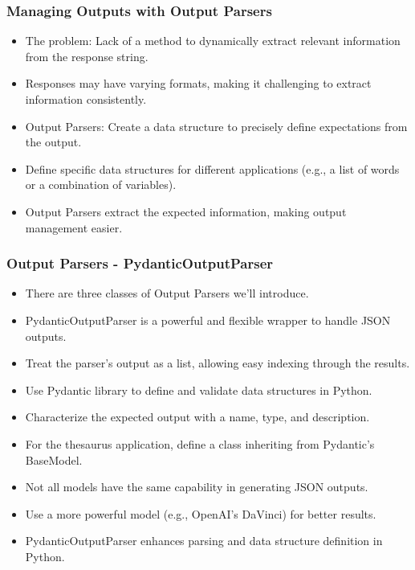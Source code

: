 \begin{frame}[fragile]
\frametitle{Managing Outputs with Output Parsers}

\begin{itemize}
    \item The problem: Lack of a method to dynamically extract relevant information from the response string.
    \item Responses may have varying formats, making it challenging to extract information consistently.
    \item Output Parsers: Create a data structure to precisely define expectations from the output.
    \item Define specific data structures for different applications (e.g., a list of words or a combination of variables).
    \item Output Parsers extract the expected information, making output management easier.
\end{itemize}

\end{frame}


\begin{frame}[fragile]
\frametitle{Output Parsers - PydanticOutputParser}

\begin{itemize}
    \item There are three classes of Output Parsers we'll introduce.
    \item PydanticOutputParser is a powerful and flexible wrapper to handle JSON outputs.
    \item Treat the parser's output as a list, allowing easy indexing through the results.
    \item Use Pydantic library to define and validate data structures in Python.
    \item Characterize the expected output with a name, type, and description.
    \item For the thesaurus application, define a class inheriting from Pydantic's BaseModel.
    \item Not all models have the same capability in generating JSON outputs.
    \item Use a more powerful model (e.g., OpenAI's DaVinci) for better results.
    \item PydanticOutputParser enhances parsing and data structure definition in Python.	
\end{itemize}

\end{frame}

